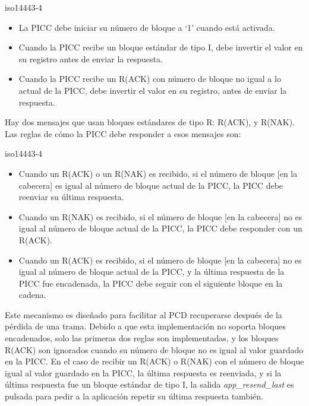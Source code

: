 \documentclass[a4paper, twoside, 11pt]{report}
\begin{document}
\begin{displaycquote}[traducido de][]{iso14443-4}
  \begin{itemize}
    \item La PICC debe iniciar su número de bloque a ‘1’ cuando está activada.
    \item Cuando la PICC recibe un bloque estándar de tipo I, debe invertir el valor en su registro antes de enviar la respuesta.
    \item Cuando la PICC recibe un R(ACK) con número de bloque no igual a lo actual de la PICC, debe invertir el valor en su registro, antes de enviar la respuesta.
  \end{itemize}
\end{displaycquote}

Hay dos mensajes que usan bloques estándares de tipo R: R(ACK), y R(NAK). Las reglas de cómo la PICC debe responder a esos mensajes son:

\begin{displaycquote}[traducido de][]{iso14443-4}
  \begin{itemize}
    \item Cuando un R(ACK) o un R(NAK) es recibido, si el número de bloque [en la cabecera] es igual al número de bloque actual de la PICC, la PICC debe reenviar su última respuesta.
    \item Cuando un R(NAK) es recibido, si el número de bloque [en la cabecera] no es igual al número de bloque actual de la PICC, la PICC debe responder con un R(ACK).
    \item Cuando un R(ACK) es recibido, si el número de bloque [en la cabecera] no es igual al número de bloque actual de la PICC, y la última respuesta de la PICC fue encadenada, la PICC debe seguir con el siguiente bloque en la cadena.
  \end{itemize}
\end{displaycquote}

Este mecanismo es diseñado para facilitar al PCD recuperarse después de la pérdida de una trama. Debido a que esta implementación no soporta bloques encadenados, solo las primeras dos reglas son implementadas, y los bloques R(ACK) son ignorados cuando su número de bloque no es igual al valor guardado en la PICC. En el caso de recibir un R(ACK) o R(NAK) con el número de bloque igual al valor guardado en la PICC, la última respuesta es reenviada, y si la última respuesta fue un bloque estándar de tipo I, la salida \textit{app\_resend\_last} es pulsada para pedir a la aplicación repetir su última respuesta también.
\end{document}
